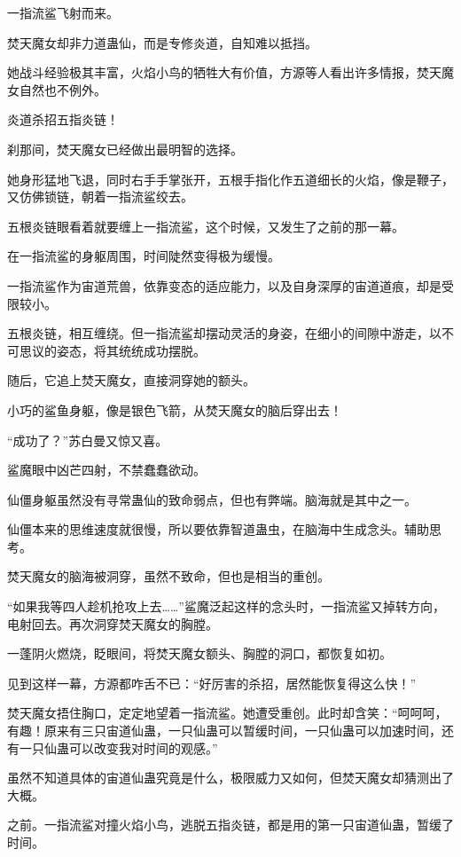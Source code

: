 
\begin{this_body}

一指流鲨飞射而来。

焚天魔女却非力道蛊仙，而是专修炎道，自知难以抵挡。

她战斗经验极其丰富，火焰小鸟的牺牲大有价值，方源等人看出许多情报，焚天魔女自然也不例外。

炎道杀招五指炎链！

刹那间，焚天魔女已经做出最明智的选择。

她身形猛地飞退，同时右手手掌张开，五根手指化作五道细长的火焰，像是鞭子，又仿佛锁链，朝着一指流鲨绞去。

五根炎链眼看着就要缠上一指流鲨，这个时候，又发生了之前的那一幕。

在一指流鲨的身躯周围，时间陡然变得极为缓慢。

一指流鲨作为宙道荒兽，依靠变态的适应能力，以及自身深厚的宙道道痕，却是受限较小。

五根炎链，相互缠绕。但一指流鲨却摆动灵活的身姿，在细小的间隙中游走，以不可思议的姿态，将其统统成功摆脱。

随后，它追上焚天魔女，直接洞穿她的额头。

小巧的鲨鱼身躯，像是银色飞箭，从焚天魔女的脑后穿出去！

“成功了？”苏白曼又惊又喜。

鲨魔眼中凶芒四射，不禁蠢蠢欲动。

仙僵身躯虽然没有寻常蛊仙的致命弱点，但也有弊端。脑海就是其中之一。

仙僵本来的思维速度就很慢，所以要依靠智道蛊虫，在脑海中生成念头。辅助思考。

焚天魔女的脑海被洞穿，虽然不致命，但也是相当的重创。

“如果我等四人趁机抢攻上去……”鲨魔泛起这样的念头时，一指流鲨又掉转方向，电射回去。再次洞穿焚天魔女的胸膛。

一蓬阴火燃烧，眨眼间，将焚天魔女额头、胸膛的洞口，都恢复如初。

见到这样一幕，方源都咋舌不已：“好厉害的杀招，居然能恢复得这么快！”

焚天魔女捂住胸口，定定地望着一指流鲨。她遭受重创。此时却含笑：“呵呵呵，有趣！原来有三只宙道仙蛊，一只仙蛊可以暂缓时间，一只仙蛊可以加速时间，还有一只仙蛊可以改变我对时间的观感。”

虽然不知道具体的宙道仙蛊究竟是什么，极限威力又如何，但焚天魔女却猜测出了大概。

之前。一指流鲨对撞火焰小鸟，逃脱五指炎链，都是用的第一只宙道仙蛊，暂缓了时间。


\end{this_body}
